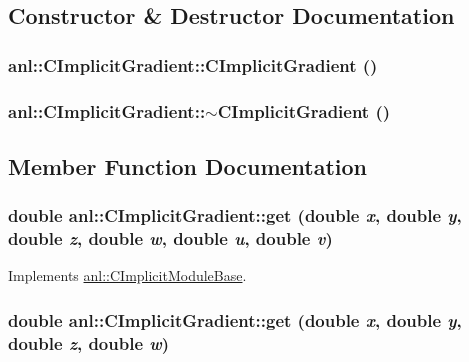 \subsection{Constructor \& Destructor Documentation}
\hypertarget{classanl_1_1CImplicitGradient_ae6fd70090f4622f4210c4515a7836068}{
\subsubsection[{CImplicitGradient}]{\setlength{\rightskip}{0pt plus 5cm}anl::CImplicitGradient::CImplicitGradient ()}}
\label{classanl_1_1CImplicitGradient_ae6fd70090f4622f4210c4515a7836068}
\hypertarget{classanl_1_1CImplicitGradient_a3c3563e493a8f017b736f190152db021}{
\subsubsection[{$\sim$CImplicitGradient}]{\setlength{\rightskip}{0pt plus 5cm}anl::CImplicitGradient::$\sim$CImplicitGradient ()}}
\label{classanl_1_1CImplicitGradient_a3c3563e493a8f017b736f190152db021}


\subsection{Member Function Documentation}
\hypertarget{classanl_1_1CImplicitGradient_a00c49e418fae08368f1fb1a915c760e9}{
\subsubsection[{get}]{\setlength{\rightskip}{0pt plus 5cm}double anl::CImplicitGradient::get (double {\em x}, \/  double {\em y}, \/  double {\em z}, \/  double {\em w}, \/  double {\em u}, \/  double {\em v})}}
\label{classanl_1_1CImplicitGradient_a00c49e418fae08368f1fb1a915c760e9}


Implements \hyperlink{classanl_1_1CImplicitModuleBase_aa40b7d54572197612a4fea44b63447eb}{anl::CImplicitModuleBase}.\hypertarget{classanl_1_1CImplicitGradient_a49c3b137f2ee2a713de213d949c2c05a}{
\subsubsection[{get}]{\setlength{\rightskip}{0pt plus 5cm}double anl::CImplicitGradient::get (double {\em x}, \/  double {\em y}, \/  double {\em z}, \/  double {\em w})}}
\label{classanl_1_1CImplicitGradient_a49c3b137f2ee2a713de213d949c2c05a}


